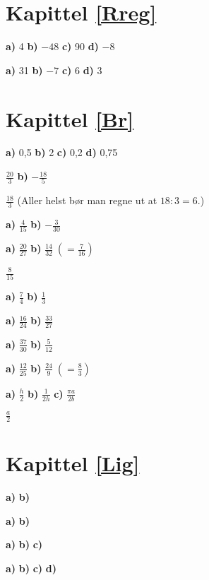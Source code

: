 

\usepackage{xr}



\section*{Kapittel \ref*{Rreg}}\vs
{} \textbf{a)} 4 \textbf{b)} $ -48 $ \textbf{c)} 90 \textbf{d)} $ -8 $

 \textbf{a)} 31 \textbf{b)} $ -7 $ \textbf{c)} 6 \textbf{d)} $ 3 $

\section*{Kapittel \ref*{Br}}\vs
{} \textbf{a)} 0,5 \textbf{b)} 2 \textbf{c)} 0,2 \textbf{d)} 0,75

 $ \frac{20}{3} $ \textbf{b)} $ -\frac{18}{5} $ 

 $ \frac{18}{3}$ (Aller helst bør man regne ut at $ 18:3=6 $.) 

 \textbf{a)} $ \frac{4}{15} $ \textbf{b)} $ -\frac{3}{30} $

 \textbf{a)} $ \frac{20}{27} $ \textbf{b)} $ \frac{14}{32}\; (=\frac{7}{16}) $

 $ \frac{8}{15} $

 \textbf{a)} $ \frac{7}{4} $ \textbf{b)} $ \frac{1}{3} $

 \textbf{a)} $ \frac{16}{24} $ \textbf{b)} $ \frac{33}{27} $

 \textbf{a)} $ \frac{37}{30} $ \textbf{b)} $ \frac{5}{12} $

 \textbf{a)} $ \frac{12}{25} $ \textbf{b)} $ \frac{24}{9}\;(=\frac{8}{3}) $

 \textbf{a)} $ \frac{h}{2} $ \textbf{b)} $ \frac{1}{2h} $ \textbf{c)} $ \frac{\pi a}{2b} $

 $ \frac{a}{2} $


\section*{Kapittel \ref*{Lig}}\vs
{} \textbf{a)}  \textbf{b)} 

 \textbf{a)}  \textbf{b)} 

 \textbf{a)}  \textbf{b)}  \textbf{c)} 

 \textbf{a)}  \textbf{b)}  \textbf{c)}  \textbf{d)} 

